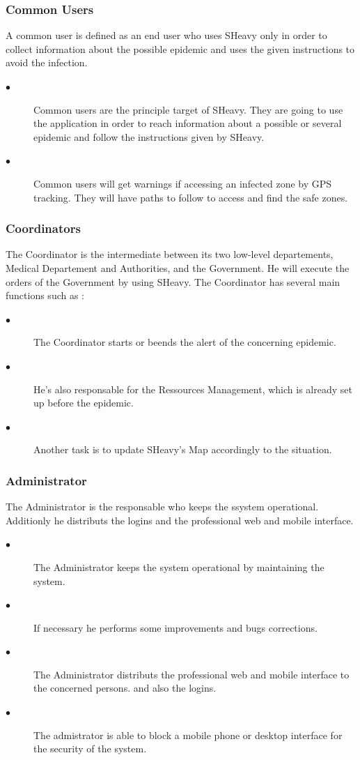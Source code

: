 \subsubsection{Common Users}
A common user is defined as an end user who uses SHeavy only in order to
collect information about the possible epidemic and uses the given instructions
to avoid the infection.\\
\begin{description}
 \item[$\bullet$] Common users are the principle target of SHeavy. They are
 going to use the application in order to reach information about a possible
 or several epidemic and follow the instructions given by SHeavy. 
 \item[$\bullet$]Common users will get warnings if accessing an infected
zone by GPS tracking. They will have paths to follow to access and find the
safe zones.
\end{description}

\subsubsection{Coordinators}
The Coordinator is the intermediate between its two low-level departements,
Medical Departement and Authorities, and the Government. He will execute the
orders of the Government by using SHeavy. The Coordinator has several main
functions such as :
\begin{description}
 \item[$\bullet$] The Coordinator starts or beends the alert of the concerning
 epidemic.
 \item[$\bullet$] He's also responsable for the Ressources Management, which is
 already set up before the epidemic.
 \item[$\bullet$] Another task is to update SHeavy's Map accordingly to the
 situation.
\end{description} 

\subsubsection{Administrator}
The Administrator is the responsable who keeps the ssystem operational.
Additionly he distributs the logins and the professional web and mobile
interface.
\begin{description}
 \item[$\bullet$] The Administrator keeps the system operational by maintaining
 the system.
 \item[$\bullet$] If necessary he performs some improvements and bugs
 corrections.
 \item[$\bullet$] The Administrator distributs the professional web and mobile
 interface to the concerned persons. and also the logins.
 \item[$\bullet$]  The admistrator is able to block a mobile phone or desktop
 interface for the security of the system.
\end{description} 

